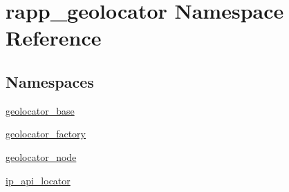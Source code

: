 \hypertarget{namespacerapp__geolocator}{\section{rapp\-\_\-geolocator Namespace Reference}
\label{namespacerapp__geolocator}
}
\subsection*{Namespaces}
\begin{DoxyCompactItemize}
\item 
\hyperlink{namespacerapp__geolocator_1_1geolocator__base}{geolocator\-\_\-base}
\item 
\hyperlink{namespacerapp__geolocator_1_1geolocator__factory}{geolocator\-\_\-factory}
\item 
\hyperlink{namespacerapp__geolocator_1_1geolocator__node}{geolocator\-\_\-node}
\item 
\hyperlink{namespacerapp__geolocator_1_1ip__api__locator}{ip\-\_\-api\-\_\-locator}
\end{DoxyCompactItemize}
